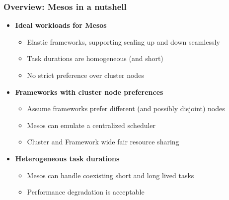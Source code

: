 \begin{frame}
\frametitle{Overview: Mesos in a nutshell}
\begin{itemize}
	\item {\bf Ideal workloads for Mesos}
	\begin{itemize}
		\item Elastic frameworks, supporting scaling up and down seamlessly
		\item Task durations are homogeneous (and short)
		\item No strict preference over cluster nodes
	\end{itemize}

\vspace{20pt}

	\item {\bf Frameworks with cluster node preferences}
	\begin{itemize}
		\item Assume frameworks prefer different (and possibly disjoint) nodes
		\item Mesos can emulate a centralized scheduler
		\item Cluster and Framework wide fair resource sharing
	\end{itemize}

\vspace{20pt}

	\item {\bf Heterogeneous task durations}
	\begin{itemize}
		\item Mesos can handle coexisting short and long lived tasks
		\item Performance degradation is acceptable
	\end{itemize}
\end{itemize}
\end{frame}

